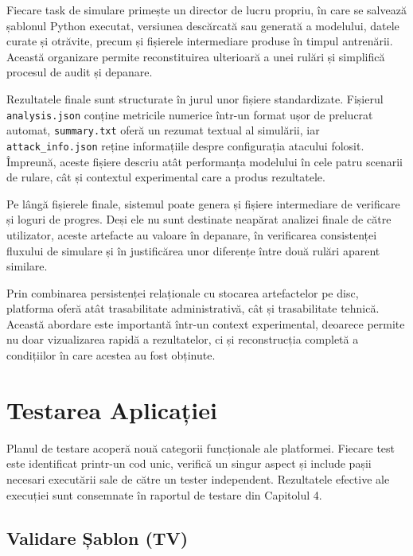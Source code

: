 \documentclass[../../main.tex]{subfiles}
\begin{document}
    Fiecare task de simulare primește un director de lucru propriu, în care se salvează șablonul Python executat, versiunea descărcată sau generată a modelului, datele curate și otrăvite, precum și fișierele intermediare produse în timpul antrenării. Această organizare permite reconstituirea ulterioară a unei rulări și simplifică procesul de audit și depanare.

    Rezultatele finale sunt structurate în jurul unor fișiere standardizate. Fișierul \texttt{analysis.json} conține metricile numerice într-un format ușor de prelucrat automat, \texttt{summary.txt} oferă un rezumat textual al simulării, iar \texttt{attack\_info.\-json} reține informațiile despre configurația atacului folosit. Împreună, aceste fișiere descriu atât performanța modelului în cele patru scenarii de rulare, cât și contextul experimental care a produs rezultatele.

    Pe lângă fișierele finale, sistemul poate genera și fișiere intermediare de verificare și loguri de progres. Deși ele nu sunt destinate neapărat analizei finale de către utilizator, aceste artefacte au valoare în depanare, în verificarea consistenței fluxului de simulare și în justificărea unor diferențe între două rulări aparent similare.

    Prin combinarea persistenței relaționale cu stocarea artefactelor pe disc, platforma oferă atât trasabilitate administrativă, cât și trasabilitate tehnică. Aceas\-tă abordare este importantă într-un context experimental, deoarece permite nu doar vizualizarea rapidă a rezultatelor, ci și reconstrucția completă a condițiilor în care acestea au fost obținute.

    \section{Testarea Aplicației}

    Planul de testare acoperă nouă categorii funcționale ale platformei. Fiecare test este identificat printr-un cod unic, verifică un singur aspect și include pașii necesari executării sale de către un tester independent. Rezultatele efective ale execuției sunt consemnate în raportul de testare din Capitolul 4.

    \subsection{Validare Șablon (TV)}
\end{document}
